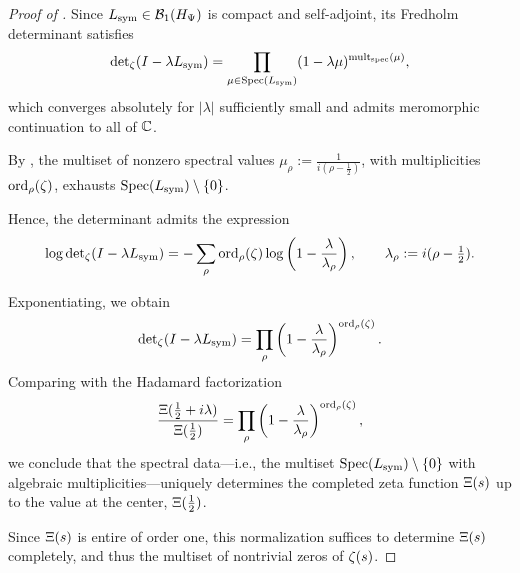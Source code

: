 \begin{proof}[Proof of ]
Since \( L_{\mathrm{sym}} \in \mathcal{B}_1(H_{\Psi}) \) is compact and self-adjoint, its Fredholm determinant satisfies
\[
\det\nolimits_\zeta(I - \lambda L_{\mathrm{sym}}) = \prod_{\mu \in \operatorname{Spec}(L_{\mathrm{sym}})} (1 - \lambda \mu)^{\operatorname{mult}_{\mathrm{spec}}(\mu)},
\]
which converges absolutely for \( |\lambda| \) sufficiently small and admits meromorphic continuation to all of \( \mathbb{C} \).

By , the multiset of nonzero spectral values \( \mu_\rho := \frac{1}{i(\rho - \tfrac{1}{2})} \), with multiplicities \( \operatorname{ord}_\rho(\zeta) \), exhausts \( \operatorname{Spec}(L_{\mathrm{sym}}) \setminus \{0\} \).

Hence, the determinant admits the expression
\[
\log \det\nolimits_\zeta(I - \lambda L_{\mathrm{sym}}) = - \sum_{\rho} \operatorname{ord}_\rho(\zeta) \log\left(1 - \frac{\lambda}{\lambda_\rho} \right), \qquad \lambda_\rho := i(\rho - \tfrac{1}{2}).
\]

Exponentiating, we obtain
\[
\det\nolimits_\zeta(I - \lambda L_{\mathrm{sym}}) = \prod_{\rho} \left(1 - \frac{\lambda}{\lambda_\rho} \right)^{\operatorname{ord}_\rho(\zeta)}.
\]
Comparing with the Hadamard factorization
\[
\frac{\Xi(\tfrac{1}{2} + i\lambda)}{\Xi(\tfrac{1}{2})} = \prod_{\rho} \left(1 - \frac{\lambda}{\lambda_\rho} \right)^{\operatorname{ord}_\rho(\zeta)},
\]
we conclude that the spectral data—i.e., the multiset \( \operatorname{Spec}(L_{\mathrm{sym}}) \setminus \{0\} \) with algebraic multiplicities—uniquely determines the completed zeta function \( \Xi(s) \) up to the value at the center, \( \Xi(\tfrac{1}{2}) \).

Since \( \Xi(s) \) is entire of order one, this normalization suffices to determine \( \Xi(s) \) completely, and thus the multiset of nontrivial zeros of \( \zeta(s) \).
\end{proof}
